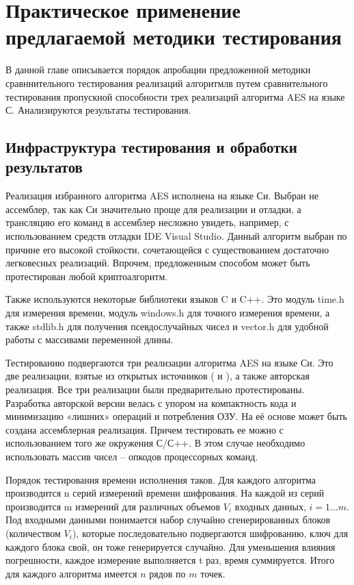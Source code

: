 \chapter{ Практическое применение предлагаемой методики тестирования } \label{ch4}

В данной главе описывается порядок апробации предложенной методики сравннительного тестирования реализаций алгоритмлв путем сравнительного тестирования пропускной способности трех реализаций алгоритма AES на языке С. Анализируются результаты тестирования.
	
\section{Инфраструктура тестирования и обработки результатов} \label{ch4:sec1}

Реализация избранного алгоритма AES исполнена на языке Си. Выбран не ассемблер, так как Си значительно проще для реализации и отладки, а трансляцию его команд в ассемблер несложно увидеть, например, с использованием средств отладки IDE Visual Studio. Данный алгоритм выбран по причине его высокой стойкости, сочетающейся с существованием достаточно легковесных реализаций. Впрочем, предложенным способом может быть протестирован любой криптоалгоритм.

Также используются некоторые библиотеки языков C и C++. Это модуль time.h для измерения времени, модуль windows.h для точного измерения времени, а также stdlib.h для получения псевдослучайных чисел и vector.h для удобной работы с массивами переменной длины.

Тестированию подвергаются три реализации алгоритма AES на языке Си. Это две реализации, взятые из открытых источников (\cite{src72} и \cite{src73}), а также авторская реализация. Все три реализации были предварительно протестированы. Разработка авторской версии велась с упором на компактность кода и минимизацию «лишних» операций и потребления ОЗУ. На её основе может быть создана ассемблерная реализация. Причем тестировать ее можно с использованием того же окружения С/С++. В этом случае необходимо использовать массив чисел – опкодов процессорных команд.

Порядок тестирования времени исполнения таков. Для каждого алгоритма производится n серий измерений времени шифрования. На каждой из серий производится m измерений для различных объемов $V_i$ входных данных, $i=1…m$. Под входными данными понимается набор случайно сгенерированных блоков (количеством $V_i$), которые последовательно подвергаются шифрованию, ключ для каждого блока свой, он тоже генерируется случайно. Для уменьшения влияния погрешности, каждое измерение выполняется t раз, время суммируется. Итого для каждого алгоритма имеется $n$ рядов по $m$ точек.

